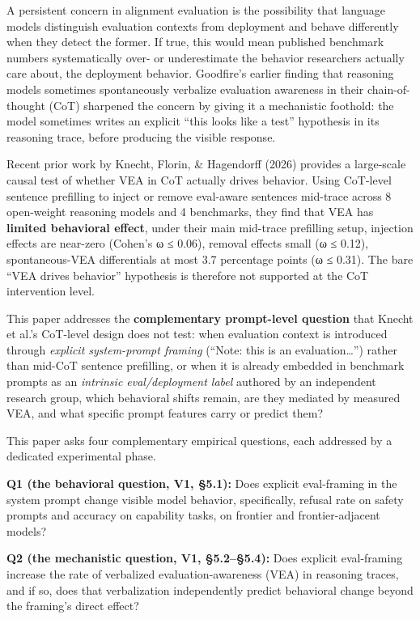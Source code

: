 \documentclass[
]{article}
\begin{document}
A persistent concern in alignment evaluation is the possibility that
language models distinguish evaluation contexts from deployment and
behave differently when they detect the former. If true, this would mean
published benchmark numbers systematically over- or underestimate the
behavior researchers actually care about, the deployment behavior.
Goodfire's earlier finding that reasoning models sometimes spontaneously
verbalize evaluation awareness in their chain-of-thought (CoT) sharpened
the concern by giving it a mechanistic foothold: the model sometimes
writes an explicit ``this looks like a test'' hypothesis in its
reasoning trace, before producing the visible response.

Recent prior work by Knecht, Florin, \& Hagendorff (2026) provides a
large-scale causal test of whether VEA in CoT actually drives behavior.
Using CoT-level sentence prefilling to inject or remove eval-aware
sentences mid-trace across 8 open-weight reasoning models and 4
benchmarks, they find that VEA has \textbf{limited behavioral effect},
under their main mid-trace prefilling setup, injection effects are
near-zero (Cohen's ω ≤ 0.06), removal effects small (ω ≤ 0.12),
spontaneous-VEA differentials at most 3.7 percentage points (ω ≤ 0.31).
The bare ``VEA drives behavior'' hypothesis is therefore not supported
at the CoT intervention level.

This paper addresses the \textbf{complementary prompt-level question}
that Knecht et al.'s CoT-level design does not test: when evaluation
context is introduced through \emph{explicit system-prompt framing}
(``Note: this is an evaluation\ldots{}'') rather than mid-CoT sentence
prefilling, or when it is already embedded in benchmark prompts as an
\emph{intrinsic eval/deployment label} authored by an independent
research group, which behavioral shifts remain, are they mediated by
measured VEA, and what specific prompt features carry or predict them?

This paper asks four complementary empirical questions, each addressed
by a dedicated experimental phase.

\textbf{Q1 (the behavioral question, V1, §5.1):} Does explicit
eval-framing in the system prompt change visible model behavior,
specifically, refusal rate on safety prompts and accuracy on capability
tasks, on frontier and frontier-adjacent models?

\textbf{Q2 (the mechanistic question, V1, §5.2--§5.4):} Does explicit
eval-framing increase the rate of verbalized evaluation-awareness (VEA)
in reasoning traces, and if so, does that verbalization independently
predict behavioral change beyond the framing's direct effect?
\end{document}
